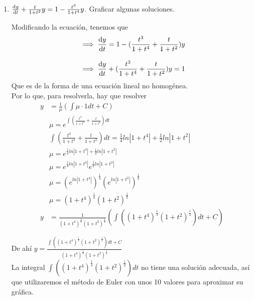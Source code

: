 \documentclass[14pt]{extarticle}
\begin{document}
\begin{enumerate}
{\begin{enumerate}
{                   De ahí $y = e^{\frac{1}{4} ln(|\frac{t}{t-4}|)}$
                }

                \item {
                    $\dv{y}{t}+\frac{t}{1+ t^2}y=1-\frac{t^3}{1+t^4}y$.
                    Graficar algunas soluciones.

                    \color{azul}
                    Modificando la ecuación, tenemos que
                    \begin{align*}
                    &\implies \dv{y}{t} = 1 - (\frac{t^3}{1 + t^4} + \frac{t}{1 + t^2})y\\[.3cm]
                    &\implies \dv{y}{t} + (\frac{t^3}{1 + t^4} + \frac{t}{1 + t^2})y = 1
                    \end{align*}
                    Que es de la forma de una ecuación lineal no homogénea.\\[.3cm]
                    Por lo que, para resolverla, hay que resolver
                    \begin{align*}
                    y&= \frac{1}{\mu} (\int \mu\cdot 1 dt + C)\\[.3cm]
                    &\mu = e^{\int (\frac{t^3}{1 + t^4} + \frac{t}{1 + t^2})dt}\\[.3cm]
                    &\int (\frac{t^3}{1 + t^4} + \frac{t}{1 + t^2})dt = \frac{1}{4} ln|1 + t^4| + \frac{1}{2}ln|1+t^2|\\[.3cm]
                    &\mu = e^{\frac{1}{4} ln|1 + t^4| + \frac{1}{2}ln|1+t^2|}\\[.3cm]
                    &\mu = e^{\frac{1}{4} ln|1 + t^4|} e^{\frac{1}{2}ln|1+t^2|}\\[.3cm]
                    &\mu = (e^{ln|1 + t^4|})^{\frac{1}{4}} (e^{ln|1+t^2|})^{\frac{1}{2}}\\[.3cm]
                    &\mu = (1 + t^4)^{\frac{1}{4}}(1+t^2)^{\frac{1}{2}}\\[.3cm]
                    y&= \frac{1}{(1 + t^4)^{\frac{1}{4}}(1+t^2)^{\frac{1}{2}}} (\int ((1 + t^4)^{\frac{1}{4}}(1+t^2)^{\frac{1}{2}} )dt + C)
                    \end{align*}

                    De ahí $y = \frac{\int ((1 + t^4)^{\frac{1}{4}}(1+t^2)^{\frac{1}{2}})dt + C}{(1 + t^4)^{\frac{1}{4}}(1+t^2)^{\frac{1}{2}}}$\\[.3cm]

                    La integral $\int ((1 + t^4)^{\frac{1}{4}}(1+t^2)^{\frac{1}{2}})dt$ no tiene una solución adecuada, así que utilizaremos el método de Euler con unos 10 valores para aproximar su gráfica.\\

}
\end{enumerate}}
\end{enumerate}
\end{document}
